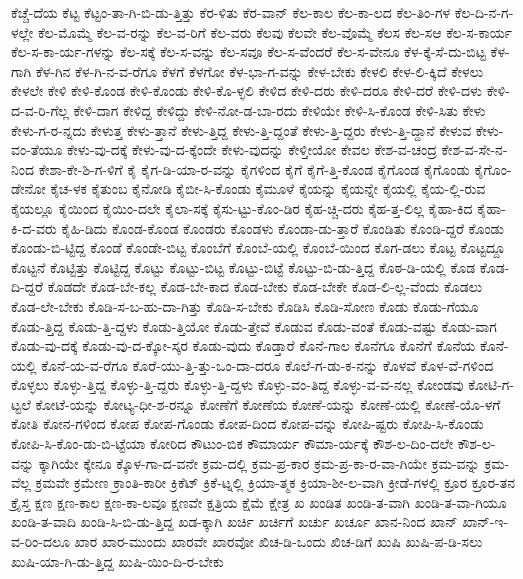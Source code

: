 {ಕೆಚ್ಚೆ-ದೆಯ
ಕೆಟ್ಟ
ಕೆಟ್ಟಂ-ತಾ-ಗಿ-ಬಿ-ಡು-ತ್ತಿತ್ತು
ಕೆರ-ಳಿತು
ಕೆರ-ವಾನ್
ಕೆಲ-ಕಾಲ
ಕೆಲ-ಕಾ-ಲದ
ಕೆಲ-ತಿಂ-ಗಳ
ಕೆಲ-ದಿ-ನ-ಗ-ಳಲ್ಲೇ
ಕೆಲ-ಮೊಮ್ಮೆ
ಕೆಲ-ವ-ರನ್ನು
ಕೆಲ-ವ-ರಿಗೆ
ಕೆಲ-ವರು
ಕೆಲವು
ಕೆಲವೇ
ಕೆಲ-ವೊಮ್ಮೆ
ಕೆಲಸ
ಕೆಲ-ಸಆ
ಕೆಲ-ಸ-ಕಾರ್ಯ
ಕೆಲ-ಸ-ಕಾ-ರ್ಯ-ಗಳನ್ನು
ಕೆಲ-ಸಕ್ಕೆ
ಕೆಲ-ಸ-ವನ್ನು
ಕೆಲ-ಸವೂ
ಕೆಲ-ಸ-ವೆಂದರೆ
ಕೆಲ-ಸ-ವೇನೂ
ಕೆಳ-ಕ್ಕೆ-ಸೆ-ದು-ಬಿಟ್ಟ
ಕೆಳ-ಗಾಗಿ
ಕೆಳ-ಗಿನ
ಕೆಳ-ಗಿ-ನ-ವ-ರೆಗೂ
ಕೆಳಗೆ
ಕೆಳಗೋ
ಕೆಳ-ಭಾ-ಗ-ವನ್ನು
ಕೇಳ-ಬೇಕು
ಕೇಳಲಿ
ಕೇಳ-ಲಿ-ಕ್ಕಿದೆ
ಕೇಳಲು
ಕೇಳಲೇ
ಕೇಳಿ
ಕೇಳಿ-ಕೊಂಡ
ಕೇಳಿ-ಕೊಂಡು
ಕೇಳಿ-ಕೊ-ಳ್ಳಲಿ
ಕೇಳಿದ
ಕೇಳಿ-ದರು
ಕೇಳಿ-ದರೂ
ಕೇಳಿ-ದರೆ
ಕೇಳಿ-ದಳು
ಕೇಳಿ-ದ-ವ-ರಿ-ಗೆಲ್ಲ
ಕೇಳಿ-ದಾಗ
ಕೇಳಿದ್ದ
ಕೇಳಿದ್ದು
ಕೇಳಿ-ನೋ-ಡ-ಬಾ-ರದು
ಕೇಳಿಯೇ
ಕೇಳಿ-ಸಿ-ಕೊಂಡ
ಕೇಳಿ-ಸಿತು
ಕೇಳು
ಕೇಳು-ಗ-ರ-ನ್ನದು
ಕೇಳುತ್ತ
ಕೇಳು-ತ್ತಾನೆ
ಕೇಳು-ತ್ತಿದ್ದ
ಕೇಳು-ತ್ತಿ-ದ್ದಂತೆ
ಕೇಳು-ತ್ತಿ-ದ್ದರು
ಕೇಳು-ತ್ತಿ-ದ್ದಾನೆ
ಕೇಳುವ
ಕೇಳು-ವಂ-ತೆಯೂ
ಕೇಳು-ವು-ದಕ್ಕೆ
ಕೇಳು-ವು-ದ-ಕ್ಕೆಂದೇ
ಕೇಳು-ವುದನ್ನು
ಕೇಳ್ತೀಯೋ
ಕೇವಲ
ಕೇಶ-ವ-ಚಂದ್ರ
ಕೇಶ-ವ-ಸೇ-ನ-ನಿಂದ
ಕೇಶಾ-ಕೇ-ಶಿ-ಗ-ಳಿಗೆ
ಕೈ
ಕೈಗ-ಡಿ-ಯಾ-ರ-ವನ್ನು
ಕೈಗಳಿಂದ
ಕೈಗೆ
ಕೈಗೆ-ತ್ತಿ-ಕೊಂಡ
ಕೈಗೊಂಡ
ಕೈಗೊಂಡು
ಕೈಗೊಂ-ಡೇನೋ
ಕೈಚ-ಳಕ
ಕೈತುಂಬ
ಕೈನೋಡಿ
ಕೈಬೀ-ಸಿ-ಕೊಂಡು
ಕೈಮೂಳೆ
ಕೈಯನ್ನು
ಕೈಯನ್ನೇ
ಕೈಯಲ್ಲಿ
ಕೈಯ-ಲ್ಲಿ-ರುವ
ಕೈಯಲ್ಲೂ
ಕೈಯಿಂದ
ಕೈಯಿಂ-ದಲೇ
ಕೈಲಾ-ಸಕ್ಕೆ
ಕೈಸು-ಟ್ಟು-ಕೊಂ-ಡಿರ
ಕೈಹ-ಚ್ಚಿ-ದರು
ಕೈಹ-ತ್ತ-ಲಿಲ್ಲ
ಕೈಹಾ-ಕಿದ
ಕೈಹಾ-ಕಿ-ದ-ವರು
ಕೈಹಿ-ಡಿದು
ಕೊಂಡ-ಕೊಂಡ
ಕೊಂಡರು
ಕೊಂಡಳು
ಕೊಂಡಾ-ಡು-ತ್ತಾರೆ
ಕೊಂಡಿತು
ಕೊಂಡಿ-ದ್ದರೆ
ಕೊಂಡು
ಕೊಂಡು-ಬಿ-ಟ್ಟಿದ್ದ
ಕೊಂಡೆ
ಕೊಂಡೇ-ಬಿಟ್ಟ
ಕೊಂಬೆಗೆ
ಕೊಂಬೆ-ಯಲ್ಲಿ
ಕೊಂಬೆ-ಯಿಂದ
ಕೊಗ-ಡಲು
ಕೊಟ್ಟ
ಕೊಟ್ಟದ್ದೂ
ಕೊಟ್ಟನೆ
ಕೊಟ್ಟಿತ್ತು
ಕೊಟ್ಟಿದ್ದ
ಕೊಟ್ಟು
ಕೊಟ್ಟು-ಬಿಟ್ಟ
ಕೊಟ್ಟು-ಬಿಟ್ಟೆ
ಕೊಟ್ಟು-ಬಿ-ಡು-ತ್ತಿದ್ದ
ಕೊಠ-ಡಿ-ಯಲ್ಲಿ
ಕೊಡ
ಕೊಡ-ದಿ-ದ್ದರೆ
ಕೊಡದೇ
ಕೊಡ-ಬೇ-ಕಲ್ಲ
ಕೊಡ-ಬೇ-ಕಾದ
ಕೊಡ-ಬೇಕು
ಕೊಡ-ಬೇಕೇ
ಕೊಡ-ಲಿ-ಲ್ಲ-ವೆಂದು
ಕೊಡಲು
ಕೊಡ-ಲೇ-ಬೇಕು
ಕೊಡಿ-ಸ-ಬ-ಹು-ದಾ-ಗಿತ್ತು
ಕೊಡಿ-ಸ-ಬೇಕು
ಕೊಡಿಸಿ
ಕೊಡಿ-ಸೋಣ
ಕೊಡು
ಕೊಡು-ಗೆಯೂ
ಕೊಡು-ತ್ತಿದ್ದ
ಕೊಡು-ತ್ತಿ-ದ್ದಳು
ಕೊಡು-ತ್ತಿಯೋ
ಕೊಡು-ತ್ತೇವೆ
ಕೊಡುವ
ಕೊಡು-ವಂತೆ
ಕೊಡು-ವಷ್ಟು
ಕೊಡು-ವಾಗ
ಕೊಡು-ವು-ದಕ್ಕೆ
ಕೊಡು-ವು-ದ-ಕ್ಕೋ-ಸ್ಕರ
ಕೊಡು-ವುದು
ಕೊಡ್ತಾರೆ
ಕೊನೆ-ಗಾಲ
ಕೊನೆಗೂ
ಕೊನೆಗೆ
ಕೊನೆಯ
ಕೊನೆ-ಯಲ್ಲಿ
ಕೊನೆ-ಯ-ವ-ರೆಗೂ
ಕೊರೆ-ಯು-ತ್ತಿ-ತ್ತು-ಒಂ-ದಾ-ದರೂ
ಕೊಲೆ-ಗ-ಡು-ಕ-ನನ್ನು
ಕೊಳವೆ
ಕೊಳ-ವೆ-ಗಳಿಂದ
ಕೊಳ್ಳಲು
ಕೊಳ್ಳು-ತ್ತಿದ್ದ
ಕೊಳ್ಳು-ತ್ತಿ-ದ್ದರು
ಕೊಳ್ಳು-ತ್ತಿ-ದ್ದಳು
ಕೊಳ್ಳು-ವಂ-ತಿದ್ದ
ಕೊಳ್ಳು-ವ-ವ-ನಲ್ಲ
ಕೋಂಡವು
ಕೋಟಿ-ಗ-ಟ್ಟಲೆ
ಕೋಟೆ-ಯನ್ನು
ಕೋಟ್ಯ-ಧೀ-ಶ-ರನ್ನೂ
ಕೋಣೆಗೆ
ಕೋಣೆಯ
ಕೋಣೆ-ಯನ್ನು
ಕೋಣೆ-ಯಲ್ಲಿ
ಕೋಣೆ-ಯೊ-ಳಗೆ
ಕೋತಿ
ಕೋನ-ಗಳಿಂದ
ಕೋಪ
ಕೋಪ-ಗೊಂಡು
ಕೋಪ-ದಿಂದ
ಕೋಪ-ವನ್ನು
ಕೋಪಿ-ಷ್ಟರು
ಕೋಪಿ-ಸಿ-ಕೊಂಡು
ಕೋಪಿ-ಸಿ-ಕೊಂ-ಡು-ಬಿ-ಟ್ಟೆಯಾ
ಕೋರಿದ
ಕೌಟುಂ-ಬಿಕ
ಕೌಮಾರ್ಯ
ಕೌಮಾ-ರ್ಯಕ್ಕೆ
ಕೌಶ-ಲ-ದಿಂ-ದಲೇ
ಕೌಶ-ಲ-ವನ್ನು
ಕ್ಕಾಗಿಯೇ
ಕ್ಕೇನೂ
ಕ್ಕೊಳ-ಗಾ-ದ-ವನೇ
ಕ್ರಮ-ದಲ್ಲಿ
ಕ್ರಮ-ಪ್ರ-ಕಾರ
ಕ್ರಮ-ಪ್ರ-ಕಾ-ರ-ವಾ-ಗಿಯೇ
ಕ್ರಮ-ವನ್ನು
ಕ್ರಮ-ವೆಲ್ಲ
ಕ್ರಮವೇ
ಕ್ರಮೇಣ
ಕ್ರಾಂತಿ-ಕಾರೀ
ಕ್ರಿಕೆಟ್
ಕ್ರಿಕೆ-ಟ್ನಲ್ಲಿ
ಕ್ರಿಯಾ-ತ್ಮಕ
ಕ್ರಿಯಾ-ಶೀ-ಲ-ವಾಗಿ
ಕ್ರೀಡೆ-ಗಳಲ್ಲಿ
ಕ್ರೂರ
ಕ್ರೂರ-ತನ
ಕ್ರೈಸ್ತ
ಕ್ಷಣ
ಕ್ಷಣ-ಕಾಲ
ಕ್ಷಣ-ಕಾ-ಲವೂ
ಕ್ಷಣವೇ
ಕ್ಷತ್ರಿಯ
ಕ್ಷೆಮೆ
ಕ್ಷೇತ್ರ
ಖ
ಖಂಡಿತ
ಖಂಡಿ-ತ-ವಾಗಿ
ಖಂಡಿ-ತ-ವಾ-ಗಿಯೂ
ಖಂಡಿ-ತ-ವಾದಿ
ಖಂಡಿ-ಸಿ-ಬಿ-ಡು-ತ್ತಿದ್ದ
ಖಡ-ಕ್ಕಾಗಿ
ಖರ್ಚಿ
ಖರ್ಚಿಗೆ
ಖರ್ಚು
ಖರ್ಚೂ
ಖಾನ-ನಿಂದ
ಖಾನ್
ಖಾನ್-ಇ-ವ-ರಿಂ-ದಲೂ
ಖಾರ
ಖಾರ-ಮುಂದು
ಖಾರವೇ
ಖಾರವೋ
ಖಿಚ-ಡಿ-ಒಂದು
ಖಿಚ-ಡಿಗೆ
ಖುಷಿ
ಖುಷಿ-ಪ-ಡಿ-ಸಲು
ಖುಷಿ-ಯಾ-ಗಿ-ಡು-ತ್ತಿದ್ದ
ಖುಷಿ-ಯಿಂ-ದಿ-ರ-ಬೇಕು
}
